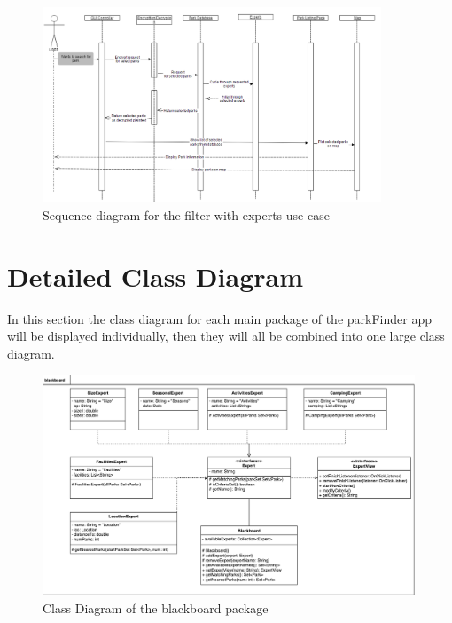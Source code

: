 \documentclass[titlepage,12pt]{article}
\begin{document}
\begin{figure}[H]
	\centerline{\includegraphics[width=0.90\textwidth]{sequence_diagrams/SpecifyExperts}}
	\caption{Sequence diagram for the filter with experts use case}
	\label{fig:SD4}
\end{figure}



\section{Detailed Class Diagram}
\label{sec:detailed_class_diagram}
In this section the class diagram for each main package of the parkFinder app will be displayed
individually, then they will all be combined into one large class diagram.

\begin{figure}[H]
    \centerline{\includegraphics[width=0.99\textwidth]{class_diagrams/blackboard_ClassDiagram}}
    \caption{Class Diagram of the blackboard package}
    \label{fig:blackboard_classDiagram}
\end{figure}
\end{document}
